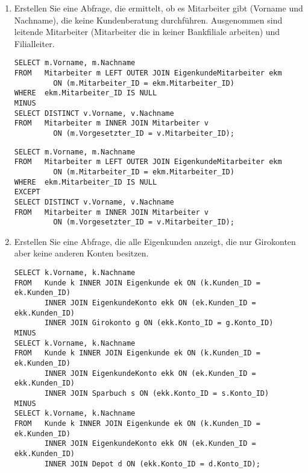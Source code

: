 \begin{enumerate}
\clearpage
        \item Erstellen Sie eine Abfrage, die ermittelt, ob es Mitarbeiter gibt
        (Vorname und Nachname), die keine Kundenberatung durchführen.
        Ausgenommen sind leitende Mitarbeiter (Mitarbeiter die in keiner
        Bankfiliale arbeiten) und Filialleiter.
        \begin{oraclesql}[\FALSE]
        \end{oraclesql}
        \begin{lstlisting}[language=oracle_sql]
SELECT m.Vorname, m.Nachname
FROM   Mitarbeiter m LEFT OUTER JOIN EigenkundeMitarbeiter ekm
         ON (m.Mitarbeiter_ID = ekm.Mitarbeiter_ID)
WHERE  ekm.Mitarbeiter_ID IS NULL
MINUS
SELECT DISTINCT v.Vorname, v.Nachname
FROM   Mitarbeiter m INNER JOIN Mitarbeiter v
         ON (m.Vorgesetzter_ID = v.Mitarbeiter_ID);
        \end{lstlisting}
        \begin{mssql}[\FALSE]
        \end{mssql}
        \begin{lstlisting}[language=ms_sql]
SELECT m.Vorname, m.Nachname
FROM   Mitarbeiter m LEFT OUTER JOIN EigenkundeMitarbeiter ekm
         ON (m.Mitarbeiter_ID = ekm.Mitarbeiter_ID)
WHERE  ekm.Mitarbeiter_ID IS NULL
EXCEPT
SELECT DISTINCT v.Vorname, v.Nachname
FROM   Mitarbeiter m INNER JOIN Mitarbeiter v
         ON (m.Vorgesetzter_ID = v.Mitarbeiter_ID);
        \end{lstlisting}
        \item Erstellen Sie eine Abfrage, die alle Eigenkunden anzeigt, die nur
        Girokonten aber keine anderen Konten besitzen.
        \begin{oraclesql}[\FALSE]
        \end{oraclesql}
        \begin{lstlisting}[language=oracle_sql]
SELECT k.Vorname, k.Nachname
FROM   Kunde k INNER JOIN Eigenkunde ek ON (k.Kunden_ID = ek.Kunden_ID)
       INNER JOIN EigenkundeKonto ekk ON (ek.Kunden_ID = ekk.Kunden_ID)
       INNER JOIN Girokonto g ON (ekk.Konto_ID = g.Konto_ID)
MINUS
SELECT k.Vorname, k.Nachname
FROM   Kunde k INNER JOIN Eigenkunde ek ON (k.Kunden_ID = ek.Kunden_ID)
       INNER JOIN EigenkundeKonto ekk ON (ek.Kunden_ID = ekk.Kunden_ID)
       INNER JOIN Sparbuch s ON (ekk.Konto_ID = s.Konto_ID)
MINUS
SELECT k.Vorname, k.Nachname
FROM   Kunde k INNER JOIN Eigenkunde ek ON (k.Kunden_ID = ek.Kunden_ID)
       INNER JOIN EigenkundeKonto ekk ON (ek.Kunden_ID = ekk.Kunden_ID)
       INNER JOIN Depot d ON (ekk.Konto_ID = d.Konto_ID);

\end{lstlisting}
\end{enumerate}
